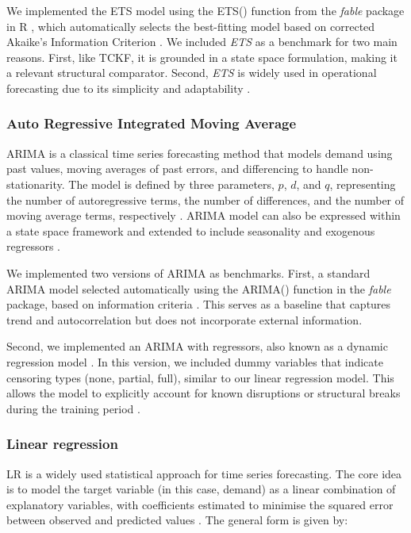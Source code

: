 \documentclass[
  authoryear,
  doubleblind,
  3p]{elsarticle}
\begin{document}
We implemented the ETS model using the ETS() function from the
\emph{fable} package in R , which automatically selects the best-fitting
model based on corrected Akaike's Information Criterion
\citep{fable2022}. We included \emph{ETS} as a benchmark for two main
reasons. First, like TCKF, it is grounded in a state space formulation,
making it a relevant structural comparator. Second, \emph{ETS} is widely
used in operational forecasting due to its simplicity and adaptability
\citep{kolassa2023}.

\subsubsection{Auto Regressive Integrated Moving
Average}\label{auto-regressive-integrated-moving-average}

ARIMA is a classical time series forecasting method that models demand
using past values, moving averages of past errors, and differencing to
handle non-stationarity. The model is defined by three parameters,
\(p\), \(d\), and \(q\), representing the number of autoregressive
terms, the number of differences, and the number of moving average
terms, respectively \citep{hyndman2021forecasting}. ARIMA model can also
be expressed within a state space framework and extended to include
seasonality and exogenous regressors \citep{trapero2024}.

We implemented two versions of ARIMA as benchmarks. First, a standard
ARIMA model selected automatically using the ARIMA() function in the
\emph{fable} package, based on information criteria \citep{fable2022}.
This serves as a baseline that captures trend and autocorrelation but
does not incorporate external information.

Second, we implemented an ARIMA with regressors, also known as a dynamic
regression model \citep{hyndman2025}. In this version, we included dummy
variables that indicate censoring types (none, partial, full), similar
to our linear regression model. This allows the model to explicitly
account for known disruptions or structural breaks during the training
period \citep{hyndman2025}.

\subsubsection{Linear regression}\label{linear-regression}

LR is a widely used statistical approach for time series forecasting.
The core idea is to model the target variable (in this case, demand) as
a linear combination of explanatory variables, with coefficients
estimated to minimise the squared error between observed and predicted
values \citep{hyndman2021forecasting}. The general form is given by:
\end{document}
